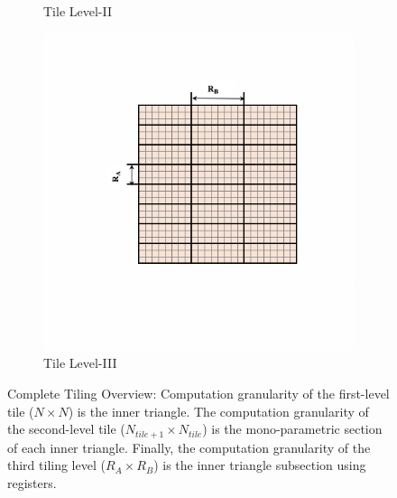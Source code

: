 \begin{figure}[htbp]
\begin{subfigure}[htbp]{0.22\linewidth}
    \caption{Tile Level-II}
    \label{fig:tile_3}
    \end{subfigure}
    \begin{subfigure}[htbp]{0.22\linewidth}
    \centering
    \includegraphics[scale=0.24, trim=2 2 2 2,clip]{content/figures/tile_3.png}
    \caption{Tile Level-III}
    \label{fig:tile_4}
    \end{subfigure}
\caption{Complete Tiling Overview: Computation granularity of the first-level tile ($N \times N$) is the inner triangle. The computation granularity of the second-level tile ($N_{tile+1} \times N_{tile}$) is the mono-parametric section of each inner triangle. Finally, the computation granularity of the third tiling level ($R_{A} \times R_{B}$) is the inner triangle subsection using registers.}
\label{fig:bpmax_full_tiling}
\end{figure}

